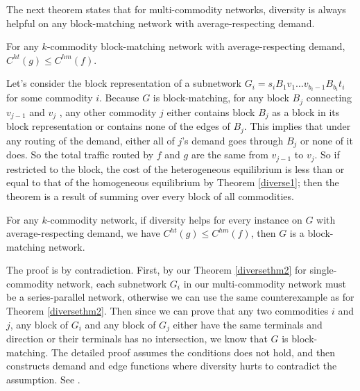 The next theorem states that for multi-commodity networks, diversity is always helpful on any block-matching network with average-respecting demand. 

\begin{theorem}
For any $k$-commodity block-matching network with average-respecting demand, $C^{ht}(g)\le C^{hm}(f)$.
\label{diverse2}
\end{theorem}

\begin{proof-sketch}

Let's consider the block representation of a subnetwork $G_i=s_i B_1 v_1\dots v_{b_i-1} B _{b_i}t_i$ for some commodity $i$. Because $G$ is block-matching, for any block $B_j$ connecting $v_{j-1}$ and $v_j$ , any other commodity $j$ either contains block $B_j$ as a block in its block representation or contains none of the edges of $B_j$. This implies that under any routing of the demand, either all of $j$'s demand goes through $B_j$ or none of it does. So the total traffic routed by $f$ and $g$ are the same from $v_{j-1}$ to $v_j$. So if restricted to the block, the cost of the heterogeneous equilibrium is less than or equal to that of the homogeneous equilibrium by Theorem \ref{diverse1}; then the theorem is a result of summing over every block of all commodities.
\end{proof-sketch}



\begin{theorem}
For any $k$-commodity network, if diversity helps for every instance on $G$ with average-respecting demand, we have $C^{ht}(g)\le C^{hm}(f)$, then $G$ is a block-matching network.
\end{theorem}

\begin{proof-sketch}
    The proof is by contradiction. First, by our Theorem \ref{diversethm2} for single-commodity network, each subnetwork $G_i$ in our multi-commodity network must be a series-parallel network, otherwise we can use the same counterexample as for Theorem \ref{diversethm2}. Then since we can prove that any two commodities $i$ and $j$, any block of $G_i$ and any block of $G_j$ either have the same terminals and direction or their terminals has no intersection, we know that $G$ is block-matching. The detailed proof assumes the conditions does not hold, and then constructs demand and edge functions where diversity hurts to contradict the assumption. See \cite{ijcai2018-24}.
\end{proof-sketch}

